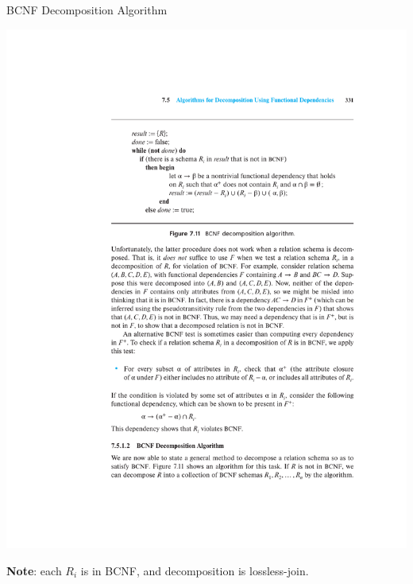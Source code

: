 \documentclass{beamer}
\begin{document}
\begin{frame}{BCNF Decomposition Algorithm}
    \begin{center}
        \includegraphics[width=\textwidth, trim={5.5cm 16.5cm 3cm 4.5cm}, clip]{figures/p331_Decomposition_BCNF}
    \end{center}
    \textbf{Note}: each $R_i$ is in BCNF, and decomposition is lossless-join.
\end{frame}
\end{document}
